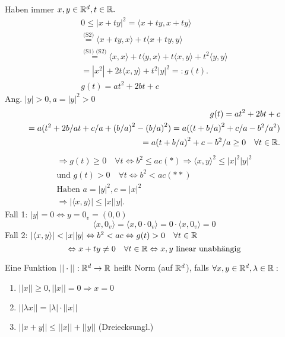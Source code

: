 \documentclass[../ana1.tex]{subfiles}
\begin{document}
\begin{bew}
	Haben immer \( x,y\in\mathbb{R}^d, t\in\mathbb{R}. \)
	\begin{align*}
		0\leq |x+ty|^2 = \langle x+ty, x+ty\rangle \\
		\overset{\text{(S2)}}{=} \langle x+ty,x\rangle + t\langle x+ty,y\rangle \\
		\overset{\text{(S1) (S2)}}{=} \langle x,x\rangle + t \langle y,x\rangle + t\langle x,y\rangle + t^2\langle y,y\rangle \\
		= |x^2| + 2t\langle x,y\rangle + t^2|y|^2 =: g(t).\\
		g(t) = at^2 + 2bt + c
	\end{align*}
	Ang. \(|y| > 0, a = |y|^2 > 0 \)
	\begin{align*}
		g(t) = at^2 + 2bt + c\\
		= a{(t^2 + 2b/a t + c/a + {(b/a)}^2 - {(b/a)}^2)} = a{({(t+b/a)}^2 + c/a - b^2/a^2)}\\
		= a{(t+b/a)}^2 + c - b^2/a \geq 0 \quad\forall t\in\mathbb{R}.
	\end{align*}
	\begin{align*}
		\Rightarrow g(t) \geq 0 \quad\forall t \Leftrightarrow b^2 \leq ac (*) \Rightarrow \langle x,y\rangle^2 \leq |x|^2|y|^2\\
		\text{und }g(t) > 0 \quad\forall t \Leftrightarrow b^2 < ac (**)\\
		\text{Haben }  a=|y|^2, c=|x|^2\\
		\Rightarrow |\langle x,y\rangle|\leq |x||y|.
	\end{align*}
	Fall 1: \(|y| = 0 \Leftrightarrow y = 0_v = (0, 0)\)
	\[\langle x, 0_v\rangle = \langle x, 0 \cdot 0_v\rangle = 0 \cdot \langle x, 0_v\rangle = 0\]
	Fall 2: \(|\langle x, y\rangle| < |x||y| \Leftrightarrow b^2 < ac \Leftrightarrow g(t) > 0 \quad \forall t \in \mathbb{R} \) \\
	\[\Leftrightarrow x + ty \neq 0 \quad \forall t \in \mathbb{R} \Leftrightarrow x, y \text{ linear unabhängig} \]
\end{bew}
\begin{defi}
	Eine Funktion \( ||\cdot || : \mathbb{R}^d \rightarrow \mathbb{R} \) heißt Norm (auf \( \mathbb{R}^d \)), falls \( \forall x,y\in\mathbb{R}^d, \lambda\in\mathbb{R}: \)
	\begin{enumerate}
		\item \( ||x||\geq 0, ||x|| = 0 \Rightarrow x = 0 \)
		\item \( ||\lambda x|| = |\lambda|\cdot||x|| \)
		\item \( ||x+y|| \leq ||x|| + ||y|| \) (Dreiecksungl.)
	\end{enumerate}
\end{defi}
\end{document}
